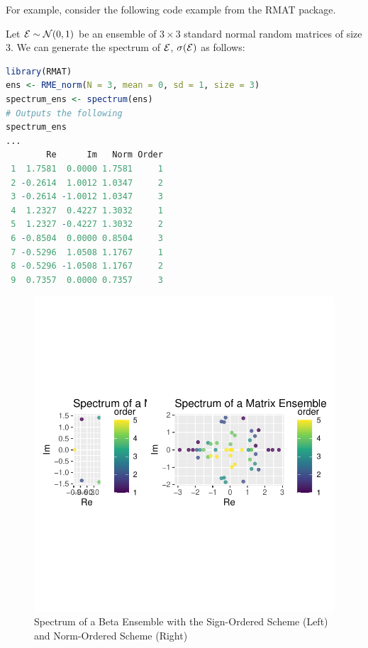 For example, consider the following code example from the RMAT package.
\begin{code}
Let $\mathcal{E} \sim \mathcal{N}(0,1)$ be an ensemble of $3 \times 3$ standard normal random matrices of size $3$. We can generate the spectrum of $\mathcal{E}$, $\sigma(\mathcal{E})$ as follows:
\end{code}

\begin{lstlisting}[language=R]
library(RMAT)
ens <- RME_norm(N = 3, mean = 0, sd = 1, size = 3)
spectrum_ens <- spectrum(ens)
# Outputs the following
spectrum_ens
...
        Re      Im   Norm Order
 1  1.7581  0.0000 1.7581     1
 2 -0.2614  1.0012 1.0347     2
 3 -0.2614 -1.0012 1.0347     3
 4  1.2327  0.4227 1.3032     1
 5  1.2327 -0.4227 1.3032     2
 6 -0.8504  0.0000 0.8504     3
 7 -0.5296  1.0508 1.1767     1
 8 -0.5296 -1.0508 1.1767     2
 9  0.7357  0.0000 0.7357     3
\end{lstlisting}

\begin{figure}[h]
 \begin{center}
  \includegraphics[scale = 0.7]{../graphics/chap2/2-1-2_comparison}
  \caption{Spectrum of a Beta Ensemble with the Sign-Ordered Scheme (Left) and Norm-Ordered Scheme (Right)}
 \end{center}
 \label{ensemble_comparison_plot}
\end{figure}

